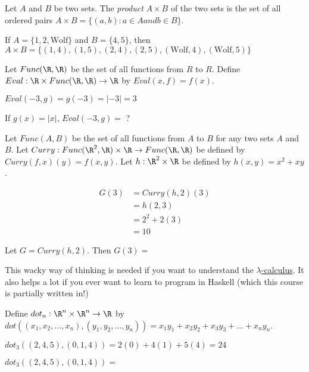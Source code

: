 \begin{definition}
	Let $A$ and $B$ be two sets.  The \textit{product}  $A\times B$ of the two sets is the set of all ordered pairs $A \times B = \{ (a,b): a \in A and b \in B\}$.
\end{definition}

\begin{example}
	If $A = \{ 1,2,\text{Wolf}\}$  and $B = \{4,5\}$, then $A \times B = \{(1,4),(1,5),(2,4),(2,5),(\text{Wolf},4),(\text{Wolf},5)\}$
\end{example}

\begin{question}

Let $Func(\R,\R)$ be the set of all functions from $R$ to $R$.  Define $Eval: \R \times Func(\R,\R) \to \R$ by $Eval(x,f) = f(x)$.
\begin{solution}
\begin{hint}
	$Eval(-3,g) = g(-3)=|-3|=3$
\end{hint}
If $g(x) = |x|$,  $Eval(-3,g)=$ ?
\end{solution}
\end{question}

\begin{question}
	Let $Func(A,B)$ be the set of all functions from $A$ to $B$ for any two sets $A$ and $B$.  
	Let $Curry:Func(\R^2,\R)\times \R \to  Func(\R,\R)$ be defined by $Curry(f,x)(y) = f(x,y)$.
	Let $h:\R^2 \times \R$ be defined by $h(x,y) = x^2 +xy$.  
	\begin{solution}
		\begin{hint}
			\begin{align*}
				G(3) &= Curry(h,2)(3)\\
				&= h(2,3)\\
				&= 2^2+2(3)\\
				&=10
			\end{align*}
		\end{hint}
		Let $G = Curry(h,2)$.  Then $G(3) =$ 
	\end{solution}
	
	This wacky way of thinking is needed if you want to understand the \href{http://en.wikipedia.org/wiki/Lambda_calculus}{$\lambda$-calculus}.  It also helps a lot if
	you ever want to learn to program in Haskell (which this course is partially written in!)
	
\end{question}

\begin{question}
Define $dot_n:\R^n \times \R^n \to \R$ by $dot((x_1,x_2,...,x_n),(y_1,y_2,...,y_n))=x_1y_1+x_2y_2+x_3y_3+...+x_ny_n$.  
\begin{solution}
\begin{hint}
	$dot_3((2,4,5),(0,1,4))= 2(0)+4(1)+5(4) = 24$
\end{hint}
$dot_3((2,4,5),(0,1,4))=$ 
\end{solution}
\end{question}

